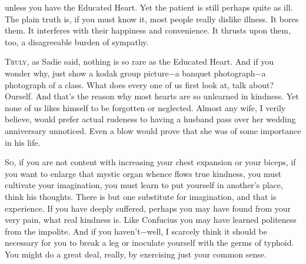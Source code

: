 \documentclass[twosided]{book}
\begin{document}
unless you have the Educated Heart. Yet the patient is still perhaps
quite as ill. The plain truth is, if you must know it, most people
really dislike illness. It bores them. It interferes with their
happiness and convenience. It thrusts upon them, too, a disagreeable
burden of sympathy.

\newpage
\lettrine{T}{ruly}, as Sadie said, nothing is so rare as the Educated Heart. And if
you wonder why, just show a kodak group picture$-$a banquet photograph$-$a
photograph of a class. What does every one of us first look at, talk
about? Ourself. And that’s the reason why most hearts are so unlearned
in kindness. Yet none of us likes himself to be forgotten or neglected.
Almost any wife, I verily believe, would prefer actual rudeness to
having a husband pass over her wedding anniversary unnoticed. Even a
blow would prove that she was of some importance in his life.

\newpage
\lettrine{S}{o}, if you are not content with increasing your chest expansion or your
biceps, if you want to enlarge that mystic organ whence flows true
kindness, you must cultivate your imagination, you must learn to put
yourself in another’s place, think his thoughts. There is but one
substitute for imagination, and that is experience. If you have deeply
suffered, perhaps you may have found from your very pain, what real
kindness is. Like Confucius you may have learned politeness from the
impolite. And if you haven’t$-$well, I scarcely think it should be
necessary for you to break a leg or inoculate yourself with the
germs of typhoid. You might do a great deal, really, by exercising
just your common sense.

\newpage
\end{document}
